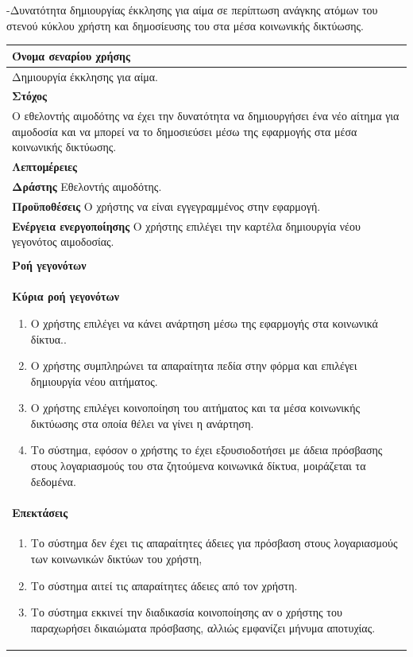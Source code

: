 -Δυνατότητα δημιουργίας έκκλησης για αίμα σε περίπτωση ανάγκης ατόμων του στενού κύκλου χρήστη και δημοσίευσης του στα μέσα κοινωνικής δικτύωσης.

\begin{center}
    \begin{tabular}{|p{\dimexpr \linewidth-2\tabcolsep}|}
    \hline
    \rowcolor{grayy}
    \textbf{Όνομα σεναρίου χρήσης}
    \\ \hline    
    Δημιουργία έκκλησης για αίμα.
     \\ \hline
    \rowcolor{grayy}
    \textbf{\textbf{Στόχος}}
    \\ \hline
 	 Ο εθελοντής αιμοδότης να έχει την δυνατότητα να δημιουργήσει ένα νέο αίτημα για αιμοδοσία και να μπορεί να το δημοσιεύσει μέσω της εφαρμογής στα μέσα κοινωνικής δικτύωσης.
    \\ \hline
    \rowcolor{grayy}
    \textbf{Λεπτομέρειες}
    \\ \hline
	\textbf{Δράστης} Εθελοντής αιμοδότης.
	\\*
	\textbf{Προϋποθέσεις} Ο χρήστης να είναι εγγεγραμμένος στην εφαρμογή.
	\\*
	\textbf{Ενέργεια ενεργοποίησης} Ο χρήστης επιλέγει την καρτέλα δημιουργία νέου γεγονότος αιμοδοσίας.
	\\ \hline
    \\ \hline
	\rowcolor{grayy}    
    \textbf{Ροή γεγονότων}
    \\* 
	\textbf{Κύρια ροή γεγονότων}
	\begin{enumerate}
	\item	 Ο χρήστης επιλέγει να κάνει ανάρτηση μέσω της εφαρμογής  στα κοινωνικά δίκτυα..
	\item Ο χρήστης συμπληρώνει τα απαραίτητα πεδία στην φόρμα και επιλέγει δημιουργία νέου αιτήματος.
	\item Ο χρήστης επιλέγει κοινοποίηση του αιτήματος και τα μέσα κοινωνικής δικτύωσης στα οποία θέλει να γίνει η ανάρτηση.
   \item Το σύστημα, εφόσον ο χρήστης το έχει εξουσιοδοτήσει με άδεια πρόσβασης στους λογαριασμούς του στα ζητούμενα κοινωνικά δίκτυα, μοιράζεται τα δεδομένα.
	\end{enumerate}
	\\*
	\textbf{Επεκτάσεις}
	   \\ \hline
	   	   \begin{enumerate}
	\item Το σύστημα δεν έχει τις απαραίτητες άδειες για πρόσβαση στους λογαριασμούς των κοινωνικών δικτύων του χρήστη,
	\item Το σύστημα αιτεί τις απαραίτητες άδειες από τον χρήστη.
	\item Το σύστημα εκκινεί την διαδικασία κοινοποίησης αν ο χρήστης του παραχωρήσει δικαιώματα πρόσβασης, αλλιώς εμφανίζει μήνυμα αποτυχίας.
	\end{enumerate}
	\\ \hline
    \end{tabular}
\end{center}	

